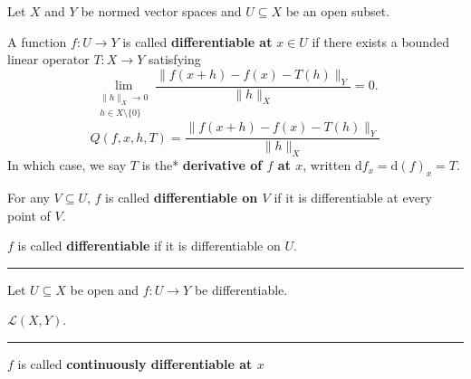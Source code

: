 \documentclass[12pt]{article}
\newcommand{\keyword}[1]{\textbf{#1}}
\newcommand{\sepline}{\rule{\textwidth}{0.4pt}}
\theoremstyle{definition}
\newcommand{\LL}{\mathcal{L}}
\newcommand{\<}{\left\langle}
\renewcommand{\>}{\right\rangle}
\newcommand{\seq}{\subseteq}
\newcommand{\dd}{\mathrm{d}}
\begin{document}
Let $X$ and $Y$ be normed vector spaces and $U \seq X$ be an open subset.

A function $f : U \to Y$ is called \keyword{differentiable at} $x \in U$ if there exists a bounded linear operator $T : X \to Y$ satisfying
\[
    \lim_{\substack{\|h\|_X \to 0 \\ h \in X \setminus\{0\}}} \frac{\|f(x + h) - f(x) - T(h)\|_Y}{\|h\|_X} = 0.
\]
\[
    Q(f, x, h, T) = \frac{\|f(x + h) - f(x) - T(h)\|_Y}{\|h\|_X}
\]
In which case, we say $T$ is the* \keyword{derivative of $f$ at $x$}, written $\dd{f}_x = \dd(f)_x = T$.



For any $V \seq U$, $f$ is called \keyword{differentiable on $V$} if it is differentiable at every point of $V$.

$f$ is called \keyword{differentiable} if it is differentiable on $U$.

\sepline

Let $U \seq X$ be open and $f : U \to Y$ be differentiable.

$\LL(X, Y)$.

\sepline

$f$ is called \keyword{continuously differentiable at $x$} 
\end{document}
